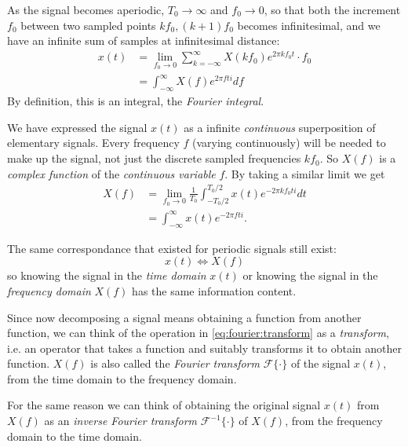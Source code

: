 As the signal becomes aperiodic, $T_0 \to \infty$ and $f_0 \to 0$, so that both the increment $f_0$ between two sampled points $k f_0, (k+1) f_0$ becomes infinitesimal, and we have an infinite sum of samples at infinitesimal distance:
\begin{equation}
    \begin{aligned}
        x(t) & = \lim_{f_0 \to 0} \sum_{k = -\infty}^{\infty} X(k f_0) e^{2 \pi k f_0 t} \cdot f_0 \\
        & = \int_{-\infty}^{\infty} X(f) e^{2 \pi f t i} df
        \label{eq:fourier:inverse-transform}
    \end{aligned}
\end{equation} 
By definition, this is an integral, the \emph{Fourier integral}. 

We have expressed the signal $x(t)$ as a infinite \emph{continuous} superposition of elementary signals. Every frequency $f$ (varying continuously) will be needed to make up the signal, not just the discrete sampled frequencies $k f_0$. So $X(f)$ is a \emph{complex function} of the \emph{continuous variable} $f$. By taking a similar limit we get
\begin{equation}
    \begin{aligned}
        X(f) & = \lim_{f_0 \to 0} \frac{1}{T_0} \int_{-T_0/2}^{T_0 / 2} x(t) e^{- 2\pi k f_0 t i} dt \\ 
        & = \int_{-\infty}^{\infty} x(t) e^{- 2 \pi f t i}.
    \end{aligned}
    \label{eq:fourier:transform}
\end{equation}

The same correspondance that existed for periodic signals still exist:
\begin{equation}
    x(t) \iff X(f)
\end{equation}
so knowing the signal in the \emph{time domain} $x(t)$ or knowing the signal in the \emph{frequency domain} $X(f)$ has the same information content.

Since now decomposing a signal means obtaining a function from another function, we can think of the operation in \cref{eq:fourier:transform} as a \emph{transform}, i.e. an operator that takes a function and suitably transforms it to obtain another function. $X(f)$ is also called the \emph{Fourier transform} $\mathcal{F}\{\cdot\}$ of the signal $x(t)$, from the time domain to the frequency domain. 

For the same reason we can think of obtaining the original signal $x(t)$ from $X(f)$ as an \emph{inverse Fourier transform} $\mathcal{F}^{-1} \{\cdot\}$ of $X(f)$, from the frequency domain to the time domain. 

